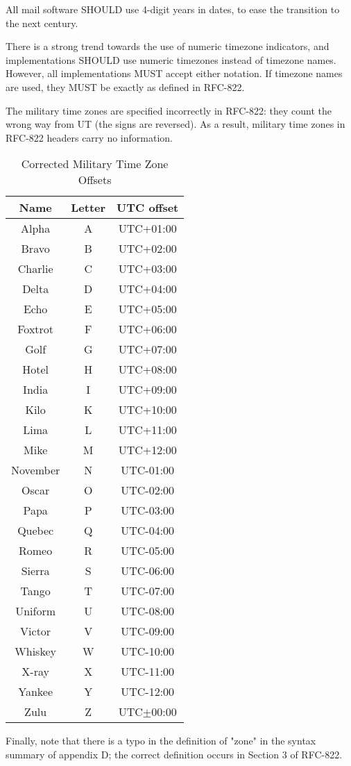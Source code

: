 \textbf{}

\pnum
All mail software SHOULD use 4-digit years in dates, to ease the
transition to the next century.

\pnum
There is a strong trend towards the use of numeric timezone
indicators, and implementations SHOULD use numeric timezones instead
of timezone names.  However, all implementations MUST accept either
notation.  If timezone names are used, they MUST be exactly as defined
in RFC-822.

\pnum
The military time zones are specified incorrectly in RFC-822: they
count the wrong way from UT (the signs are reversed).  As a result,
military time zones in RFC-822 headers carry no information.

\begin{longtable}{ c c c }
\caption{Corrected Military Time Zone Offsets} \\
\toprule
\textbf{Name} &
\textbf{Letter} &
\textbf{UTC offset} \\
\midrule
\endhead
Alpha & A & UTC+01:00 \\
Bravo & B & UTC+02:00 \\
Charlie & C & UTC+03:00 \\
Delta & D & UTC+04:00 \\
Echo & E & UTC+05:00 \\
Foxtrot & F & UTC+06:00 \\
Golf & G & UTC+07:00 \\
Hotel & H & UTC+08:00 \\
India & I & UTC+09:00 \\
Kilo & K & UTC+10:00 \\
Lima & L & UTC+11:00 \\
Mike & M & UTC+12:00 \\
November & N & UTC-01:00 \\
Oscar & O & UTC-02:00 \\
Papa & P & UTC-03:00 \\
Quebec & Q & UTC-04:00 \\
Romeo & R & UTC-05:00 \\
Sierra & S & UTC-06:00 \\
Tango & T & UTC-07:00 \\
Uniform & U & UTC-08:00 \\
Victor & V & UTC-09:00 \\
Whiskey & W & UTC-10:00 \\
X-ray & X & UTC-11:00 \\
Yankee & Y & UTC-12:00 \\
Zulu & Z & UTC$\pm$00:00 \\
\end{longtable}



\pnum
Finally, note that there is a typo in the definition of "zone" in the
syntax summary of appendix D; the correct definition occurs in Section
3 of RFC-822.
